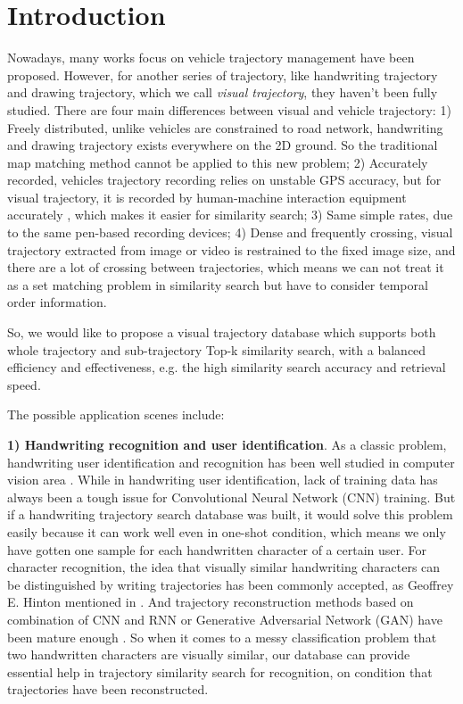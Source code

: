 \documentclass[sigconf]{acmart}
\begin{document}
\maketitle

\section{Introduction}
Nowadays, many works focus on vehicle trajectory management have been proposed. However, for another series of trajectory, like handwriting trajectory and drawing trajectory, which we call \textit{visual trajectory}, they haven't been fully studied. There are four main differences between visual and vehicle trajectory: 1) Freely distributed, unlike vehicles are constrained to road network, handwriting and drawing trajectory exists everywhere on the 2D ground. So the traditional map matching method \cite{Wang2018} cannot be applied to this new problem; 2) Accurately recorded, vehicles trajectory recording relies on unstable GPS accuracy, but for visual trajectory, it is recorded by human-machine interaction equipment accurately \cite{VikramLR13}, which makes it easier for similarity search; 3) Same simple rates, due to the same pen-based recording devices; 4) Dense and frequently crossing, visual trajectory extracted from image or video is restrained to the fixed image size, and there are a lot of crossing between trajectories, which means we can not treat it as a set matching problem in similarity search but have to consider temporal order information. 

So, we would like to propose a visual trajectory database which supports both whole trajectory and sub-trajectory Top-k similarity search, with a balanced efficiency and effectiveness, e.g. the high similarity search accuracy and retrieval speed. 

The possible application scenes include: 

\noindent
\textbf{1) Handwriting recognition and user identification}. As a classic problem, handwriting user identification and recognition has been well studied in computer vision area \cite{WangL17}. While in handwriting user identification, lack of training data has always been a tough issue for Convolutional Neural Network (CNN) training. But if a handwriting trajectory search database was built, it would solve this problem easily because it can work well even in one-shot condition, which means we only have gotten one sample for each handwritten character of a certain user. For character recognition, the idea that visually similar handwriting characters can be distinguished by writing trajectories has been commonly accepted, as Geoffrey E. Hinton mentioned in \cite{HintonN05}. And trajectory reconstruction methods based on combination of CNN and RNN or Generative Adversarial Network (GAN) have been mature enough \cite{ICPRtraj, GuptaJFSA18}. So when it comes to a messy classification problem that two handwritten characters are visually similar, our database can provide essential help in trajectory similarity search for recognition, on condition that trajectories have been reconstructed. 
\end{document}
